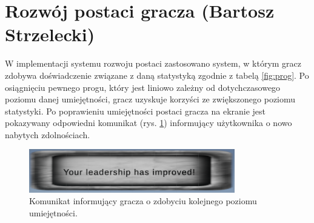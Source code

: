 \section{Rozwój postaci gracza (Bartosz Strzelecki)}\label{s:impl_progres}
W implementacji systemu rozwoju postaci zastosowano system, w którym gracz zdobywa doświadczenie związane z daną statystyką
zgodnie z tabelą \ref{fig:prog}. Po osiągnięciu pewnego progu, który jest liniowo zależny od dotychczasowego poziomu danej umiejętności,
gracz uzyskuje korzyści ze zwiększonego poziomu statystyki. Po poprawieniu umiejętności postaci gracza na ekranie jest pokazywany odpowiedni
komunikat (rys. \ref{fig:modal}) informujący użytkownika o nowo nabytych zdolnościach.


\begin{figure}[htbp]
    \centering
    \includegraphics[width=0.8\textwidth]{images/modal}
    \caption{Komunikat informujący gracza o zdobyciu kolejnego poziomu umiejętności.}\label{fig:modal}
\end{figure}
